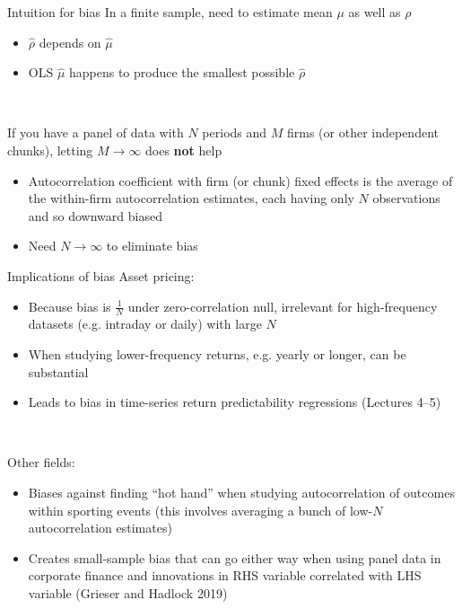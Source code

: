 \documentclass[xcolor=table, aspectratio=169]{beamer}
\begin{document}
\begin{frame}{Intuition for bias}
In a finite sample, need to estimate mean $\mu$ as well as $\rho$
\begin{itemize}
    \item $\hat{\rho}$ depends on $\hat{\mu}$
    \item OLS $\hat{\mu}$ happens to produce the smallest possible $\hat{\rho}$
\end{itemize}

~

If you have a panel of data with $N$ periods and $M$ firms (or other independent chunks), letting $M \rightarrow \infty$ does \textbf{not} help
\begin{itemize}
    \item Autocorrelation coefficient with firm (or chunk) fixed effects is the average of the within-firm autocorrelation estimates, each having only $N$ observations and so downward biased
    \item Need $N \rightarrow \infty$ to eliminate bias
\end{itemize}
\end{frame}

\begin{frame}{Implications of bias}
Asset pricing:
\begin{itemize}
    \item Because bias is $\frac{1}{N}$ under zero-correlation null, irrelevant for high-frequency datasets (e.g. intraday or daily) with large $N$
    \item When studying lower-frequency returns, e.g. yearly or longer, can be substantial
    \item Leads to bias in time-series return predictability regressions (Lectures 4--5)
\end{itemize}

~

Other fields:
\begin{itemize}
    \item Biases against finding ``hot hand'' when studying autocorrelation of outcomes within sporting events (this involves averaging a bunch of low-$N$ autocorrelation estimates)
    \item Creates small-sample bias that can go either way when using panel data in corporate finance and innovations in RHS variable correlated with LHS variable (Grieser and Hadlock 2019)
\end{itemize}

\end{frame}
\end{document}
